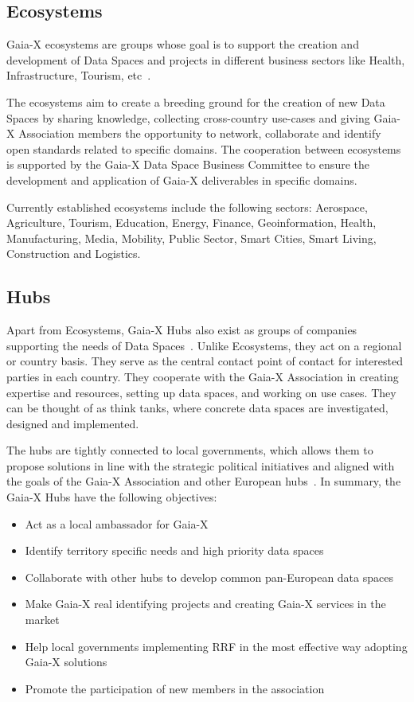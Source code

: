 \subsection{Ecosystems}\label{subsec:ecosystems}

Gaia-X ecosystems are groups whose goal is to support the creation and development of Data Spaces and projects in different business sectors like Health, Infrastructure, Tourism, etc~\cite{gaiax}. %

The ecosystems aim to create a breeding ground for the creation of new Data Spaces by sharing knowledge, collecting cross-country use-cases and giving Gaia-X Association members the opportunity to network, collaborate and identify open standards related to specific domains.
The cooperation between ecosystems is supported by the Gaia-X Data Space Business Committee to ensure the development and application of Gaia-X deliverables in specific domains.

Currently established ecosystems include the following sectors: Aerospace, Agriculture, Tourism, Education, Energy, Finance, Geoinformation, Health, Manufacturing, Media, Mobility, Public Sector, Smart Cities, Smart Living, Construction and Logistics.

\subsection{Hubs}\label{subsec:hubs}

Apart from Ecosystems, Gaia-X Hubs also exist as groups of companies supporting the needs of Data Spaces~\cite{gaiax}.
Unlike Ecosystems, they act on a regional or country basis.
They serve as the central contact point of contact for interested parties in each country.
They cooperate with the Gaia-X Association in creating expertise and resources, setting up data spaces, and working on use cases.
They can be thought of as think tanks, where concrete data spaces are investigated, designed and implemented.

The hubs are tightly connected to local governments, which allows them to propose solutions in line with the strategic political initiatives and aligned with the goals of the Gaia-X Association and other European hubs~\cite{gaiax}.
In summary, the Gaia-X Hubs have the following objectives:
\begin{itemize}
    \item Act as a local ambassador for Gaia-X
    \item Identify territory specific needs and high priority data spaces
    \item Collaborate with other hubs to develop common pan-European data spaces
    \item Make Gaia-X real identifying projects and creating Gaia-X services in the market
    \item Help local governments implementing RRF in the most effective way adopting Gaia-X solutions
    \item Promote the participation of new members in the association
\end{itemize}
